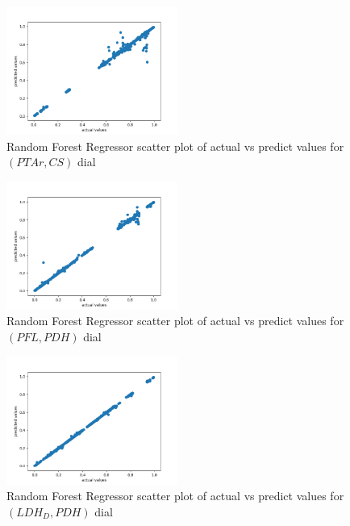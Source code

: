 \documentclass[12pt,chapterheads]{ucsd}
\begin{document}
\begin{figure}[h] 
\centering
\includegraphics[width=0.5\textwidth]{Figures/PTAr_CS_rfr}
\caption[Random Forest Regressor scatter plot of actual vs predict values for $(PTAr, CS)$ dial]
{Random Forest Regressor scatter plot of actual vs predict values for $(PTAr, CS)$ dial}
\label{fig:PtarCsRfr}
\end{figure}

\begin{figure}[h] 
\centering
\includegraphics[width=0.5\textwidth]{Figures/PFL_PDH_rfr}
\caption[Random Forest Regressor scatter plot of actual vs predict values for $(PFL, PDH)$ dial]
{Random Forest Regressor scatter plot of actual vs predict values for $(PFL, PDH)$ dial}
\label{fig:PflPdhRfr}
\end{figure}

\begin{figure}[h] 
\centering
\includegraphics[width=0.5\textwidth]{Figures/LDH_D_PDH_rfr}
\caption[Random Forest scatter plot of actual vs predict values for \string(LDH\textunderscore D, PDH) dial]
{Random Forest Regressor scatter plot of actual vs predict values for $(LDH_D, PDH)$ dial}
\label{fig:LdhPdhRfr}
\end{figure}
\end{document}
